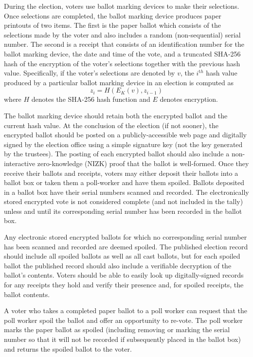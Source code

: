 During the election, voters use ballot marking devices to make their selections.  Once selections are completed, the ballot marking device produces paper printouts of two items.  The first is the paper ballot which consists of the selections made by the voter and also includes a random (non-sequential) serial number.  The second is a receipt that consists of an identification number for the ballot marking device, the date and time of the vote, and a truncated SHA-256 hash of the \elgamal encryption of the voter's selections together with the previous hash value.  Specifically, if the voter's selections are denoted by $v$, the $i^{\mathrm th}$ hash value produced by a particular ballot marking device in an election is computed as
\[
z_i=H(E_K(v),z_{i-1} )
\]
\noindent
where $H$ denotes the SHA-256 hash function and $E$ denotes \elgamal encryption.

The ballot marking device should retain both the encrypted ballot and the current hash value.  At the conclusion of the election (if not sooner), the encrypted ballot should be posted on a publicly-accessible web page and digitally signed by the election office using a simple signature key (not the key generated by the trustees).  The posting of each encrypted ballot should also include a non-interactive zero-knowledge (NIZK) proof that the ballot is well-formed.
Once they receive their ballots and receipts, voters may either deposit their ballots into a ballot box or taken them a poll-worker and have them spoiled.  Ballots deposited in a ballot box have their serial numbers scanned and recorded.  The electronically stored encrypted vote is not considered complete (and not included in the tally) unless and until its corresponding serial number has been recorded in the ballot box.

Any electronic stored encrypted ballots for which no corresponding serial number has been scanned and recorded are deemed spoiled.  The published election record should include all spoiled ballots as well as all cast ballots, but for each spoiled ballot the published record should also include a verifiable decryption of the ballot's contents.  Voters should be able to easily look up digitally-signed records for any receipts they hold and verify their presence and, for spoiled receipts, the ballot contents.

A voter who takes a completed paper ballot to a poll worker can request that the poll worker spoil the ballot and offer an opportunity to re-vote.  The poll worker marks the paper ballot as spoiled (including removing or marking the serial number so that it will not be recorded if subsequently placed in the ballot box) and returns the spoiled ballot to the voter.

